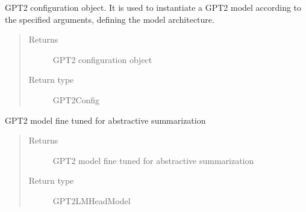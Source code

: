 \documentclass[letterpaper,10pt,english]{sphinxmanual}
\begin{document}
\begin{fulllineitems}

\begin{fulllineitems}
\label{\detokenize{code:gpt2_summarizer_inference.InferenceGPT2Summarizer.config}}
\sphinxAtStartPar
GPT2 configuration object. It is used to instantiate a GPT\sphinxhyphen{}2 model
according to the specified arguments, defining the model architecture.
\begin{quote}\begin{description}
\item[{Returns}] \leavevmode
\sphinxAtStartPar
GPT2 configuration object

\item[{Return type}] \leavevmode
\sphinxAtStartPar
GPT2Config

\end{description}\end{quote}

\end{fulllineitems}


\begin{fulllineitems}
\label{\detokenize{code:gpt2_summarizer_inference.InferenceGPT2Summarizer.model}}
\sphinxAtStartPar
GPT2 model fine tuned for abstractive summarization
\begin{quote}\begin{description}
\item[{Returns}] \leavevmode
\sphinxAtStartPar
GPT2 model fine tuned for abstractive summarization

\item[{Return type}] \leavevmode
\sphinxAtStartPar
GPT2LMHeadModel

\end{description}\end{quote}

\end{fulllineitems}


\end{fulllineitems}
\end{document}
